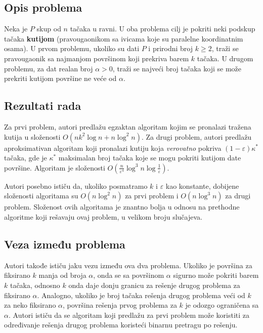 \documentclass{article}
\begin{document}
\subsection{Opis problema}

Neka je $P$ skup od $n$ tačaka u ravni. U oba problema cilj je pokriti neki podskup tačaka \textbf{kutijom} (pravougaonikom sa ivicama koje su paralelne koordinatnim osama). U prvom problemu, ukoliko su dati $P$ i prirodni broj $k \geqslant 2$, traži se pravougaonik sa najmanjom površinom koji prekriva barem $k$ tačaka. U drugom problemu, za dat realan broj $\alpha > 0$, traži se najveći broj tačaka koji se može prekriti
kutijom površine ne veće od $\alpha$.

\subsection{Rezultati rada}

Za prvi problem, autori predlažu egzaktan algoritam kojim se pronalazi tražena kutija u složenosti $O \left( n k^2 \log n + n \log^2 n \right)$.
Za drugi problem, autori predlažu aproksimativan algoritam koji pronalazi kutiju koja {\em verovatno} pokriva $(1 - \varepsilon) \kappa^\ast$ tačaka,
gde je $\kappa^\ast$ maksimalan broj tačaka koje se mogu pokriti kutijom date površine. Algoritam je složenosti
$O \left( \frac{n}{\varepsilon^4} \log^3 n \log \frac{1}{\varepsilon} \right)$.

Autori posebno ističu da, ukoliko posmatramo $k$ i $\varepsilon$ kao konstante, dobijene složenosti algoritama su
$O (n \log^2 n)$ za prvi problem i $O (n \log^3 n)$ za drugi problem. Složenost ovih algoritama je znantno bolja u odnosu na prethodne algoritme koji rešavaju ovaj problem, u velikom broju slučajeva.

\subsection{Veza između problema}

Autori takođe ističu jaku vezu između ova dva problema. Ukoliko je površina za fiksirano $k$ manja od broja $\alpha$, onda se sa površinom $\alpha$ sigurno može pokriti barem $k$ tačaka, odnosno $k$ onda daje donju granicu za rešenje drugog problema za fiksirano $\alpha$.
Analogno, ukoliko je broj tačaka rešenja drugog problema veći od $k$ za neko fiksirano $\alpha$, površina rešenja prvog problema za $k$ je odozgo ograničena sa $\alpha$. Autori ističu da se algoritam koji predlažu za prvi problem može koristiti za određivanje rešenja drugog problema koristeći binarnu pretragu po rešenju.
\end{document}
